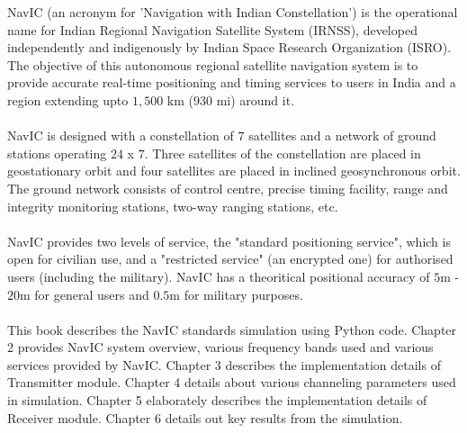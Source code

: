 




%


NavIC (an acronym for 'Navigation with Indian Constellation') is the operational name for Indian Regional Navigation Satellite System (IRNSS), developed independently and indigenously by Indian Space Research Organization (ISRO). The objective of this autonomous regional satellite navigation system is to provide accurate real-time positioning and timing services to users in India and a region extending upto $1,500$ km ($930$ mi) around it. 
\\
\\
NavIC is designed with a constellation of $7$ satellites and a network of ground stations operating $24$ x $7$. Three satellites of the constellation
are placed in geostationary orbit and four satellites are placed in inclined geosynchronous orbit. The ground network consists of control centre, precise timing facility, range and integrity monitoring stations, two-way ranging stations, etc.
\\
\\
NavIC provides two levels of service, the "standard positioning service", which is open for civilian use, and a "restricted service" (an encrypted one) for authorised users (including the military). NavIC has a theoritical positional accuracy of $5$m - $20$m for general users and $0.5$m for military purposes.
\\
\\
This book describes the NavIC standards simulation using Python code. Chapter 2  provides NavIC system overview, various frequency bands used and various services provided by NavIC. Chapter 3 describes the implementation details of Transmitter module. Chapter 4 details about various channeling parameters used in simulation. Chapter 5 elaborately describes the implementation details of Receiver module. Chapter 6 details out key results from the simulation.   
\\
\\
